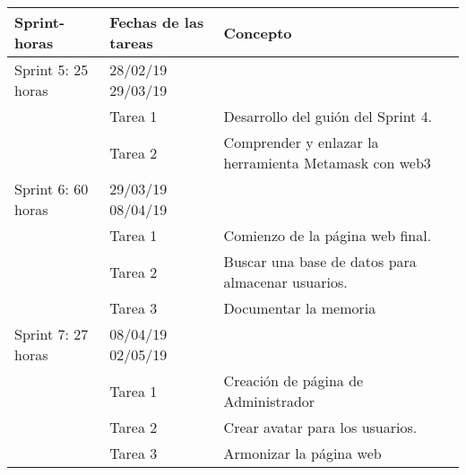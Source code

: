 \begin{table}[H]
\begin{tabular}{|p{1.5cm}|p{1.5cm}|p{5cm}}
\hline
\textbf{Sprint- horas} &  \textbf{Fechas de las tareas} & \multicolumn{1}{l|}{\textbf{Concepto}}                                                                                    \\ \hline
Sprint 5: 25 horas       & 28/02/19 29/03/19           & \multicolumn{1}{l|}{}                                                                                             \\ \hline
                         & Tarea 1                       & \multicolumn{1}{p{9.2cm}|}{Desarrollo del guión del Sprint 4.}                                                           \\ \hline
                         & Tarea 2                       & \multicolumn{1}{p{9.2cm}|}{Comprender y enlazar la herramienta Metamask con web3}                                        \\ \hline
Sprint 6: 60 horas       & 29/03/19 08/04/19           & \multicolumn{1}{l|}{}                                                                                             \\ \hline
                         & Tarea 1                       & \multicolumn{1}{p{9.2cm}|}{Comienzo de la página web final.}                                                             \\ \hline
                         & Tarea 2                       & \multicolumn{1}{p{9.2cm}|}{Buscar una base de datos para almacenar usuarios.}                                            \\ \hline
                         & Tarea 3                       & \multicolumn{1}{p{9.2cm}|}{Documentar la memoria}                                                                        \\ \hline
Sprint 7: 27 horas       & 08/04/19 02/05/19           & \multicolumn{1}{p{9.2cm}|}{}                                                                                             \\ \hline
                         & Tarea 1                       & \multicolumn{1}{p{9.2cm}|}{Creación de página de Administrador}                                                          \\ \hline
                         & Tarea 2                       & \multicolumn{1}{p{9.2cm}|}{Crear avatar para los usuarios.}                                                              \\ \hline
                         & Tarea 3                       & \multicolumn{1}{p{9.2cm}|}{Armonizar la página web}                                                                      \\ \hline
                       


\end{tabular}
\end{table}
